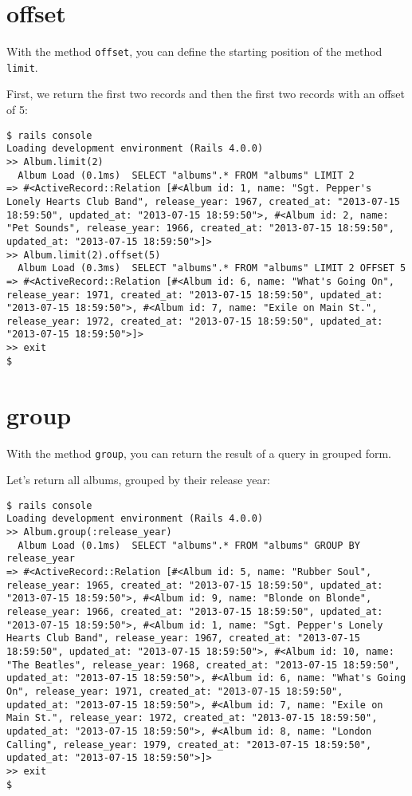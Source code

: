 \documentclass[a4paper]{book}
\newcommand{\chap}[1]{\newpage\thispagestyle{empty}\chapter{#1}\label{chap:\thechapter}}
\begin{document}
\chap{offset}\label{offset}

With the method \texttt{offset}, you can define the starting position of the method \texttt{limit}.

First, we return the first two records and then the first two records with an offset of 5:

\begin{shaded}\begin{verbatim}
$ rails console
Loading development environment (Rails 4.0.0)
>> Album.limit(2)
  Album Load (0.1ms)  SELECT "albums".* FROM "albums" LIMIT 2
=> #<ActiveRecord::Relation [#<Album id: 1, name: "Sgt. Pepper's Lonely Hearts Club Band", release_year: 1967, created_at: "2013-07-15 18:59:50", updated_at: "2013-07-15 18:59:50">, #<Album id: 2, name: "Pet Sounds", release_year: 1966, created_at: "2013-07-15 18:59:50", updated_at: "2013-07-15 18:59:50">]>
>> Album.limit(2).offset(5)
  Album Load (0.3ms)  SELECT "albums".* FROM "albums" LIMIT 2 OFFSET 5
=> #<ActiveRecord::Relation [#<Album id: 6, name: "What's Going On", release_year: 1971, created_at: "2013-07-15 18:59:50", updated_at: "2013-07-15 18:59:50">, #<Album id: 7, name: "Exile on Main St.", release_year: 1972, created_at: "2013-07-15 18:59:50", updated_at: "2013-07-15 18:59:50">]>
>> exit
$
\end{verbatim}\end{shaded}

\chap{group}\label{group}

With the method \texttt{group}, you can return the result of a query in grouped form.

Let's return all albums, grouped by their release year:

\begin{shaded}\begin{verbatim}
$ rails console
Loading development environment (Rails 4.0.0)
>> Album.group(:release_year)
  Album Load (0.1ms)  SELECT "albums".* FROM "albums" GROUP BY release_year
=> #<ActiveRecord::Relation [#<Album id: 5, name: "Rubber Soul", release_year: 1965, created_at: "2013-07-15 18:59:50", updated_at: "2013-07-15 18:59:50">, #<Album id: 9, name: "Blonde on Blonde", release_year: 1966, created_at: "2013-07-15 18:59:50", updated_at: "2013-07-15 18:59:50">, #<Album id: 1, name: "Sgt. Pepper's Lonely Hearts Club Band", release_year: 1967, created_at: "2013-07-15 18:59:50", updated_at: "2013-07-15 18:59:50">, #<Album id: 10, name: "The Beatles", release_year: 1968, created_at: "2013-07-15 18:59:50", updated_at: "2013-07-15 18:59:50">, #<Album id: 6, name: "What's Going On", release_year: 1971, created_at: "2013-07-15 18:59:50", updated_at: "2013-07-15 18:59:50">, #<Album id: 7, name: "Exile on Main St.", release_year: 1972, created_at: "2013-07-15 18:59:50", updated_at: "2013-07-15 18:59:50">, #<Album id: 8, name: "London Calling", release_year: 1979, created_at: "2013-07-15 18:59:50", updated_at: "2013-07-15 18:59:50">]>
>> exit
$
\end{verbatim}\end{shaded}
\end{document}
